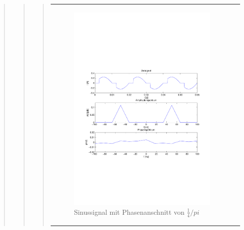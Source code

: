 \begin{quote}
\begin{quote}
\begin{quote}
                \begin{center}
                \begin{tabular}{ll}
    
                \hspace{-11em}
                    \begin{minipage}{0.6\textwidth}
    
                        \begin{figure}[H]
                            \label{fig:}
                            \includegraphics[scale=0.5, trim = 2cm 7cm 1.5cm 8.5cm, clip]{./Bilder/Phasenanschnitt28pi.pdf} %
                            \caption{Sinussignal mit Phasenanschnitt von $\frac{1}{4}/pi$}
                        \end{figure}
    

\end{minipage}
\end{tabular}
\end{center}
\end{quote}
\end{quote}
\end{quote}
